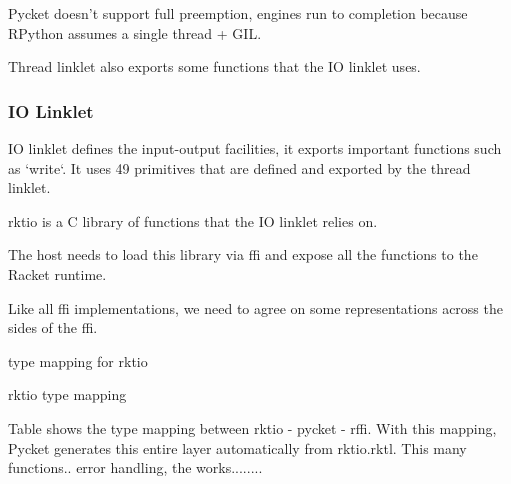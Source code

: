 				\begin{paragraph-here}%
					Pycket doesn't support full preemption, engines run to completion because RPython assumes a single thread + GIL.
				\end{paragraph-here}

				\begin{paragraph-here}%
					Thread linklet also exports some functions that the IO linklet uses.
				\end{paragraph-here}

			\subsubsection{IO Linklet}

				\begin{paragraph-here}%
					IO linklet defines the input-output facilities, it exports important functions such as `write`. It uses 49 primitives that are defined and exported by the thread linklet.
				\end{paragraph-here}

				\begin{paragraph-here}%
					rktio is a C library of functions that the IO linklet relies on.
				\end{paragraph-here}

				\begin{paragraph-here}%
					The host needs to load this library via ffi and expose all the functions to the Racket runtime.
				\end{paragraph-here}

				\begin{paragraph-here}%
					Like all ffi implementations, we need to agree on some representations across the sides of the ffi.
				\end{paragraph-here}

				\begin{table-here}
					type mapping for rktio

					\begin{todo}
						rktio type mapping
					\end{todo}
				\end{table-here}

				\begin{paragraph-here}%
					Table shows the type mapping between rktio - pycket - rffi. With this mapping, Pycket generates this entire layer automatically from rktio.rktl. This many functions.. error handling, the works........
				\end{paragraph-here}

